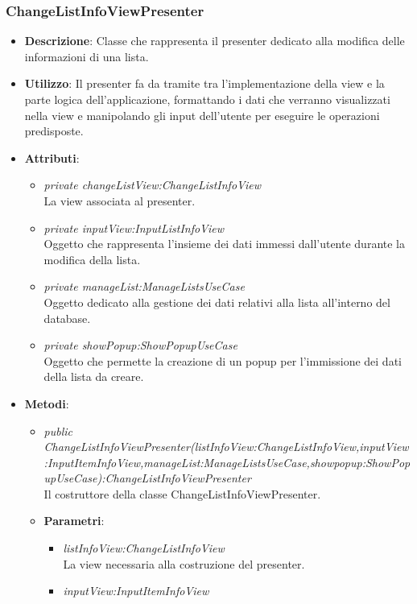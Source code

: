 \subsubsection{ChangeListInfoViewPresenter}
\begin{itemize}
\item \textbf{Descrizione}: Classe che rappresenta il presenter dedicato alla modifica delle informazioni di una lista.
\item \textbf{Utilizzo}: Il presenter fa da tramite tra l'implementazione della view e la parte logica dell'applicazione, formattando i dati che verranno visualizzati nella view e manipolando gli input dell'utente per eseguire le operazioni predisposte.
\item \textbf{Attributi}:
	\begin{itemize}
	\item \textit{private changeListView:ChangeListInfoView}\\
		La view associata al presenter.
	\item \textit{private inputView:InputListInfoView}\\
		Oggetto che rappresenta l'insieme dei dati immessi dall'utente durante la modifica della lista.
	\item \textit{private manageList:ManageListsUseCase}\\
Oggetto dedicato alla gestione dei dati relativi alla lista all'interno del database.
	\item \textit{private showPopup:ShowPopupUseCase}\\
		Oggetto che permette la creazione di un popup per l'immissione dei dati della lista da creare.	
	\end{itemize} 
\item \textbf{Metodi}:
	\begin{itemize}
	\item \textit{public ChangeListInfoViewPresenter(listInfoView:ChangeListInfoView,inputView:InputItemInfoView,manageList:ManageListsUseCase,showpopup:ShowPopupUseCase):ChangeListInfoViewPresenter}\\
Il costruttore della classe ChangeListInfoViewPresenter.
			\item{\textbf{Parametri}: \begin{itemize}
			\item \textit{listInfoView:ChangeListInfoView}\\
			La view necessaria alla costruzione del presenter.
			\item \textit{inputView:InputItemInfoView}\\

\end{itemize}}
\end{itemize}
\end{itemize}
